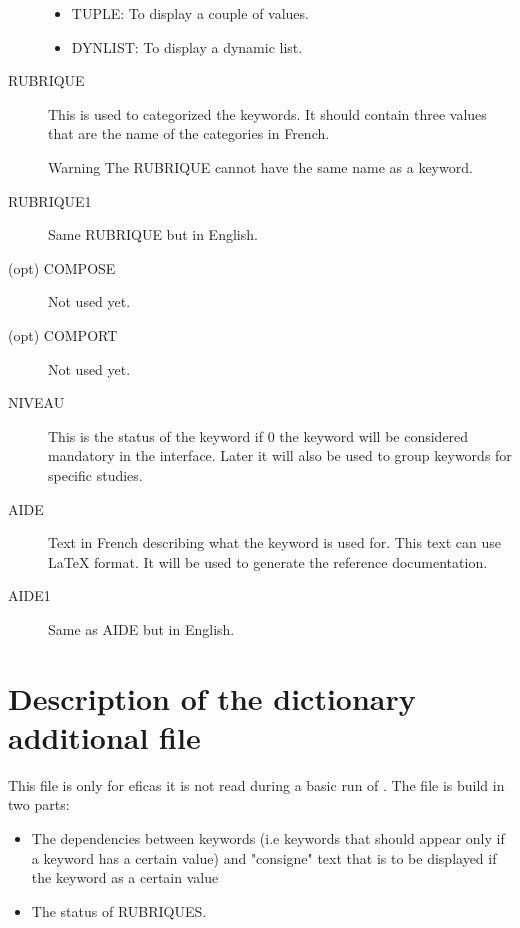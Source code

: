 \begin{description}
\begin{itemize}
    \item TUPLE: To display a couple of values.
    \item DYNLIST: To display a dynamic list.
  \end{itemize}
\item[RUBRIQUE] This is used to categorized the keywords. It should contain
  three values that are the name of the categories in French.\\
  \begin{WarningBlock}{Warning}
    The RUBRIQUE cannot have the same name as a keyword.
  \end{WarningBlock}
\item[RUBRIQUE1] Same RUBRIQUE but in English.
\item[(opt) COMPOSE] Not used yet.
\item[(opt) COMPORT] Not used yet.
\item[NIVEAU] This is the status of the keyword if 0 the keyword will be
  considered mandatory in the interface. Later it will also be used to group
  keywords for specific studies.
\item[AIDE] Text in French describing what the keyword is used for. This text
  can use LaTeX format. It will be used to generate the reference
  documentation.
\item[AIDE1] Same as AIDE but in English.
\end{description}

\section{Description of the dictionary additional file}
\label{ref:descDicoAdd}
This file is only for eficas it is not read during a basic run of
\telemacsystem. The file is build in two parts:
\begin{itemize}
  \item The dependencies between keywords (i.e keywords that should appear only
    if a keyword has a certain value) and "consigne" text that is to be
    displayed if the keyword as a certain value
  \item The status of RUBRIQUES.
\end{itemize}

